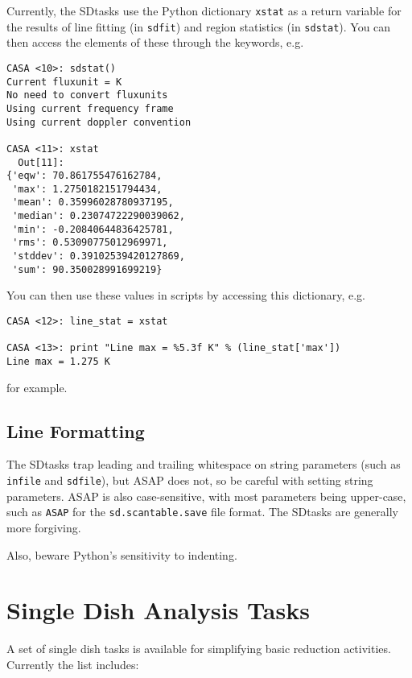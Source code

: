 Currently, the SDtasks use the Python dictionary {\tt xstat} as
a return variable for the results of line fitting (in {\tt sdfit})
and region statistics (in {\tt sdstat}).  You can then access the
elements of these through the keywords, e.g.
\small
\begin{verbatim}
CASA <10>: sdstat()
Current fluxunit = K
No need to convert fluxunits
Using current frequency frame
Using current doppler convention

CASA <11>: xstat
  Out[11]: 
{'eqw': 70.861755476162784,
 'max': 1.2750182151794434,
 'mean': 0.35996028780937195,
 'median': 0.23074722290039062,
 'min': -0.20840644836425781,
 'rms': 0.53090775012969971,
 'stddev': 0.39102539420127869,
 'sum': 90.350028991699219}
\end{verbatim}
\normalsize
You can then use these values in scripts by accessing this dictionary,
e.g.
\small
\begin{verbatim}
CASA <12>: line_stat = xstat

CASA <13>: print "Line max = %5.3f K" % (line_stat['max'])
Line max = 1.275 K
\end{verbatim}
\normalsize
for example.

\subsection{Line Formatting}
\label{section:sd.intro.line}

The SDtasks trap leading and trailing whitespace on string parameters
(such as {\tt infile} and {\tt sdfile}), but ASAP does not, so be
careful with setting string parameters.  ASAP is also case-sensitive,
with most parameters being upper-case, such as {\tt ASAP} for the
{\tt sd.scantable.save} file format.  The SDtasks are generally
more forgiving.

Also, beware Python's sensitivity to indenting.

\section{Single Dish Analysis Tasks}
\label{section:sd.sdtasks}

A set of single dish tasks is available for simplifying basic
reduction activities. Currently the list includes:

